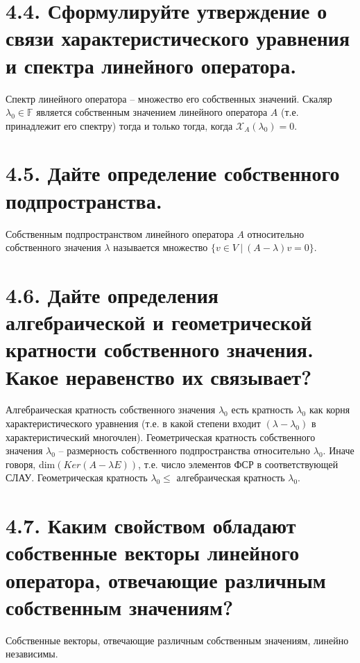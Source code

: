 \documentclass{article}
\begin{document}
\section*{\LARGE 4.4. Сформулируйте утверждение о связи характеристического уравнения и спектра линейного оператора.}
Спектр линейного оператора -- множество его собственных значений.
\newline Скаляр $\lambda_0 \in \mathbb{F}$ является собственным значением линейного оператора $A$ (т.е. принадлежит его спектру) тогда и только тогда, когда $\mathcal{X}_A(\lambda_0) = 0$.

\section*{\LARGE 4.5. Дайте определение собственного подпространства.}
Собственным подпространством линейного оператора $A$ относительно собственного значения $\lambda$ называется множество $\{v \in V \:|\: (A - \lambda)v = 0\}$.

\section*{\LARGE 4.6. Дайте определения алгебраической и геометрической кратности собственного значения. Какое неравенство их связывает?}
Алгебраическая кратность собственного значения $\lambda_0$ есть кратность $\lambda_0$ как корня характеристического уравнения (т.е. в какой степени входит $(\lambda - \lambda_0)$ в характеристический многочлен).
\newline Геометрическая кратность собственного значения $\lambda_0$ -- размерность собственного подпространства относительно $\lambda_0$. Иначе говоря, dim$(Ker(A - \lambda E))$, т.е. число элементов ФСР в соответствующей СЛАУ.
\newline Геометрическая кратность $\lambda_0 \le$ алгебраическая кратность $\lambda_0$. 
\section*{\LARGE 4.7. Каким свойством обладают собственные векторы линейного оператора, отвечающие различным собственным значениям?}
Собственные векторы, отвечающие различным собственным значениям, линейно независимы.
\end{document}
